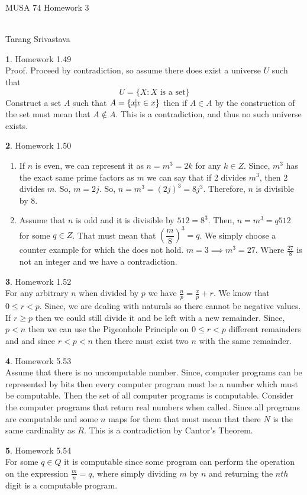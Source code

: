 \documentclass[10pt, twocolumn]{article}
\author{Tarang Srivastava}
\newcommand{\makechaptertitle}[1]{
\begin{center}
	\begin{large}
		#1
	\end{large}
	\begin{small}
		\\Tarang Srivastava
	\end{small}
\end{center}
}
\theoremstyle{definition}
\newtheorem{q}{}
\begin{document}
	
\makechaptertitle{MUSA 74 Homework 3}

\begin{q}
	Homework 1.49 \\
	Proof. Proceed by contradiction, so assume there does exist a universe $ U $ such that
	\[ U = \{X : X \text{ is a set} \} \]
	Construct a set $ A $ such that
	$ A = \{ x \vline x \in x \} $
	then if $ A \in A$ by the construction of the set must mean that $ A \not \in A $. This is a contradiction, and thus no such universe exists.
\end{q}
\begin{q}
	Homework 1.50
	\begin{enumerate}
		\item If $ n $ is even, we can represent it as $ n = m^3 = 2k $ for any $ k \in Z $. Since, $ m^3 $ has the exact same prime factors as $ m $ we can say that if 2 divides $ m^3 $, then 2 divides $ m $. So, $ m = 2j $. So, $ n = m^3 = (2j)^3 = 8 j^3$. Therefore, $ n $ is divisible by 8.
		\item Assume that $ n $ is odd and it is divisible by $ 512 = 8^3 $. Then, $ n = m^3 = q 512 $ for some $ q \in Z $. That must mean that $ \left(\dfrac{m}{8}\right)^3 = q $. We simply choose a counter example for which the does not hold. $ m = 3 \implies m^3 = 27 $. Where $ \frac{27}{8} $ is not an integer and we have a contradiction.
	\end{enumerate}
\end{q}
\begin{q}
	Homework 1.52 \\
	For any arbitrary $ n $ when divided by $ p $ we have $ \frac{n}{p} = \frac{x}{p} + r $. We know that $ 0 \leq r < p $. Since, we are dealing with naturals so there cannot be negative values. If $ r \geq p $ then we could still divide it and be left with a new remainder. Since, $ p < n $ then we can use the Pigeonhole Principle on $ 0 \leq r < p $ different remainders and and since $ r < p < n $ then there must exist two $ n $ with the same remainder.
\end{q}
\begin{q}
	Homework 5.53 \\ 
	Assume that there is no uncomputable number. Since, computer programs can be represented by bits then every computer program must be a number which must be computable. Then the set of all computer programs is computable. Consider the computer programs that return real numbers when called. Since all programs are computable and some $ n $ maps for them that must mean that there $ N $ is the same cardinality as $ R $. This is a contradiction by Cantor's Theorem. 
\end{q}
\begin{q}
	Homework 5.54 \\
	For some $ q \in Q $ it is computable since some program can perform the operation on the expression $ \frac{m}{n} = q $, where simply dividing $ m $ by $ n $ and returning the $ nth $ digit is a computable program.
\end{q}
\end{document}

